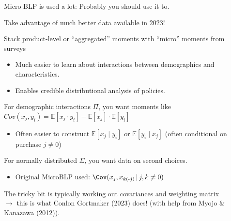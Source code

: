 \begin{frame}{Micro BLP is used a lot: Probably you should use it to.}
    \begin{wideitemize}
        \item Take advantage of much better data available in 2023!
        \item Stack product-level or ``\alert{aggregated}'' moments with ``\alert{micro}'' moments from surveys
        \begin{itemize}
            \item Much easier to learn about interactions between demographics and characteristics.
            \item Enables credible \alert{distributional analysis} of policies.
        \end{itemize}
        \item For demographic interactions $\Pi$, you want moments like $Cov(x_j, y_i) = \mathbb{E}[x_j \cdot y_i] -\mathbb{E}[x_j] \cdot \mathbb{E}[y_i]$
        \begin{itemize}
            \item Often easier to construct $\mathbb{E}[x_j \mid y_i]$ or $\mathbb{E}[y_i \mid x_j]$ (often conditional on purchase $j \neq 0$)
        \end{itemize}
        \item For normally distributed $\Sigma$, you want \alert{data on second choices}.
        \begin{itemize}
            \item Original MicroBLP used: $\Cov(x_j, x_{k(\text{-}j)} \,|\, j, k \neq 0)$
        \end{itemize}
        \item The tricky bit is typically working out covariances and weighting matrix\\ $\rightarrow$ this is what Conlon Gortmaker (2023) does! (with help from Myojo \& Kanazawa (2012)).
    \end{wideitemize}
\end{frame}


